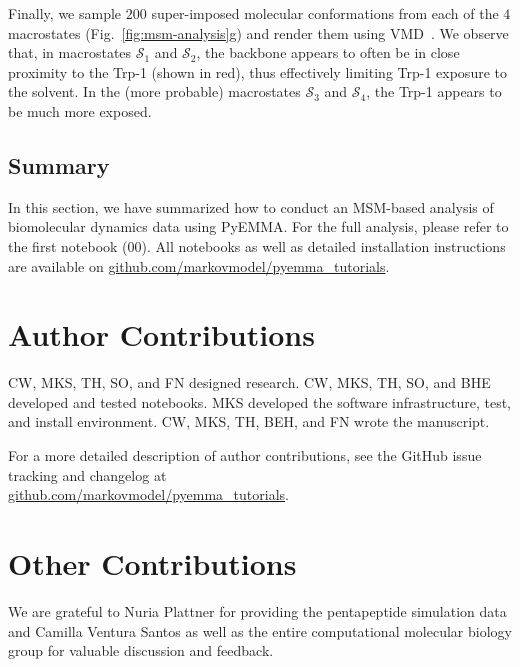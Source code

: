 \documentclass[9pt,tutorial]{livecoms}
\newcommand{\githubrepository}{\url{github.com/markovmodel/pyemma_tutorials}}
\begin{document}
Finally, we sample $200$ super-imposed molecular conformations from each of the $4$ macrostates (Fig.~\ref{fig:msm-analysis}g) and render them using VMD~\cite{vmd}.
We observe that, in macrostates $\mathcal{S}_1$ and $\mathcal{S}_2$, the backbone appears to often be in close proximity to the Trp-1 (shown in red), thus effectively limiting Trp-1 exposure to the solvent.
In the (more probable) macrostates $\mathcal{S}_3$ and $\mathcal{S}_4$, the Trp-1 appears to be much more exposed.

\subsection{Summary}

In this section, we have summarized how to conduct an MSM-based analysis of biomolecular dynamics data using PyEMMA. For the full analysis, please refer to the first notebook (00). All notebooks as well as detailed installation instructions are available on \githubrepository{}.

\section{Author Contributions}
%
CW, MKS, TH, SO, and FN designed research.
CW, MKS, TH, SO, and BHE developed and tested notebooks.
MKS developed the software infrastructure, test, and install environment.
CW, MKS, TH, BEH, and FN wrote the manuscript.

For a more detailed description of author contributions, see the GitHub issue tracking and changelog at\\\githubrepository{}.

\section{Other Contributions}
%
We are grateful to Nuria Plattner for providing the pentapeptide simulation data and Camilla Ventura Santos as well as the entire computational molecular biology group for valuable discussion and feedback.
\end{document}
